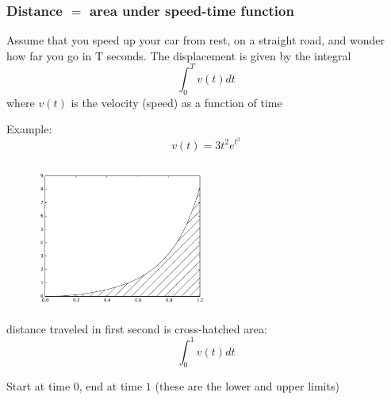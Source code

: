 \documentclass[english,14pt]{beamer}
\begin{document}
\begin{frame}[fragile]

\frametitle{Distance $=$ area under speed-time function}

Assume that you speed up your car from rest, on a straight road, and wonder how far you go in T seconds. The displacement is given by the integral
\[
\int_0^T v(t)dt
\]
where $v(t)$ is the velocity (speed) as a function of time

Example:
\[
v(t) = 3t^2e^{t^3}
\]

\end{frame}


\begin{frame}[fragile]

\frametitle{}

\begin{figure}[ht]
	\centering
	\includegraphics[width=0.5\textwidth]{figures/LLp134}
\end{figure}

distance traveled in first second is cross-hatched area:
\[
\int_0^1 v(t)dt
\]

Start at time $0$, end at time $1$ (these are the lower and upper limits)
\end{frame}

\end{document}
